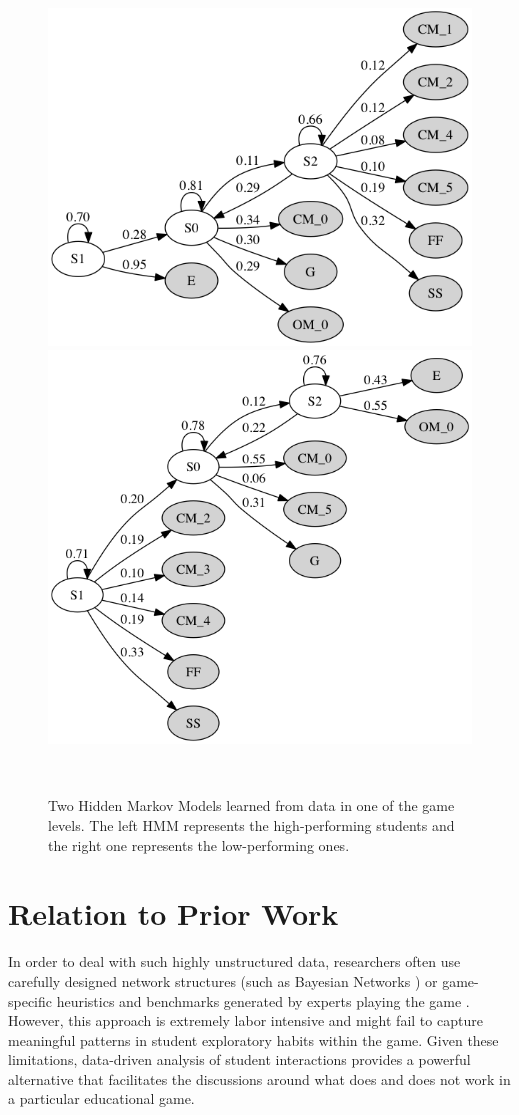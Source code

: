 \documentclass{sigchi}
\begin{document}
\begin{figure}
	\centering
	\includegraphics[width=0.9\columnwidth]{figures/high}
	\includegraphics[width=0.9\columnwidth]{figures/low}
	\caption{Two Hidden Markov Models learned from data in one of the game levels. The left HMM represents the high-performing students and the right one represents the low-performing ones.}~\label{fig:highvslow}
\end{figure}


\section{Relation to Prior Work}
In order to deal with such highly unstructured data, researchers often use carefully designed network structures (such as Bayesian Networks \cite{albrecht1998bayesian,shute2013stealth}) or game-specific heuristics and benchmarks generated by experts playing the game \cite{mandel2014offline,tastan2011learning}. However, this approach is extremely labor intensive and might fail to capture meaningful patterns in student exploratory habits within the game. Given these limitations, data-driven analysis of student interactions provides a powerful alternative that facilitates the discussions around what does and does not work in a particular educational game.
\end{document}
